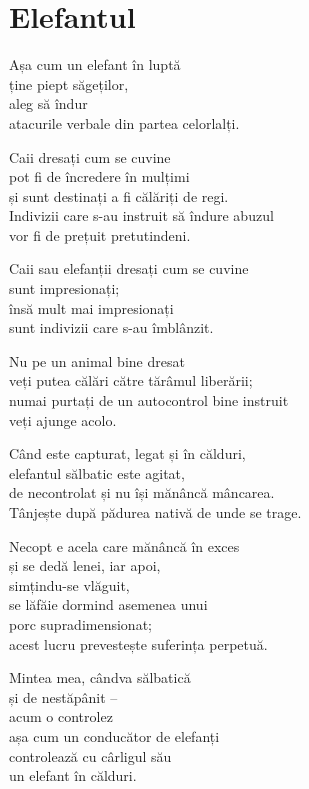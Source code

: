 
\chapter{Elefantul}


Așa cum un elefant în luptă\\
ține piept săgeților,\\
aleg să îndur\\
atacurile verbale din partea celorlalți.


Caii dresați cum se cuvine\\
pot fi de încredere în mulțimi\\
și sunt destinați a fi călăriți de regi.\\
Indivizii care s-au instruit să îndure abuzul\\
vor fi de prețuit pretutindeni.

Caii sau elefanții dresați cum se cuvine\\
sunt impresionați;\\
însă mult mai impresionați\\
sunt indivizii care s-au îmblânzit.


Nu pe un animal bine dresat\\
veți putea călări către tărâmul liberării;\\
numai purtați de un autocontrol bine instruit\\
veți ajunge acolo.


Când este capturat, legat și în călduri,\\
elefantul sălbatic este agitat,\\
de necontrolat și nu își mănâncă mâncarea.\\
Tânjește după pădurea nativă de unde se trage.

Necopt e acela care mănâncă în exces\\
și se dedă lenei, iar apoi,\\
simțindu-se vlăguit,\\
se lăfăie dormind asemenea unui\\
porc supradimensionat;\\
acest lucru prevestește suferința perpetuă.


Mintea mea, cândva sălbatică\\
și de nestăpânit –\\
acum o controlez\\
așa cum un conducător de elefanți\\
controlează cu cârligul său\\
un elefant în călduri.


